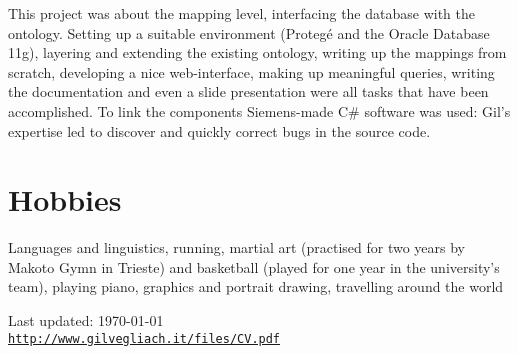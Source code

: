 \documentclass[letterpaper]{article}
\def\footerlink{http://www.gilvegliach.it/files/CV.pdf}
\renewenvironment{itemize}{
  \begin{list}{}{
    \setlength{\leftmargin}{1.5em}
  }
}{
  \end{list}
}
\newenvironment{itemize1}{
  \begin{list}{}{
    \setlength{\leftmargin}{0em}
  }
}{
  \end{list}
}
\begin{document}
\begin{itemize1}
\begin{itemize}
This project was about the mapping level, interfacing the database with the ontology. Setting up a suitable environment (Proteg\'e and the Oracle Database 11g), layering and extending the existing ontology, writing up the mappings from scratch, developing a nice web-interface, making up meaningful queries, writing the documentation and even a slide presentation were all tasks that have been accomplished. To link the components Siemens-made C\# software was used: Gil's expertise led to discover and quickly correct bugs in the source code. 
\end{itemize}
\end{itemize1}

\section*{Hobbies}
Languages and linguistics, running, martial art (practised for two years by Makoto Gymn in Trieste) and basketball (played for one year in the university's team), playing piano, graphics and portrait drawing, travelling around the world


\bigskip

\begin{center}
  \begin{footnotesize}
    Last updated: \today \\
    \href{\footerlink}{\texttt{\footerlink}}
  \end{footnotesize}
\end{center}
\end{document}
